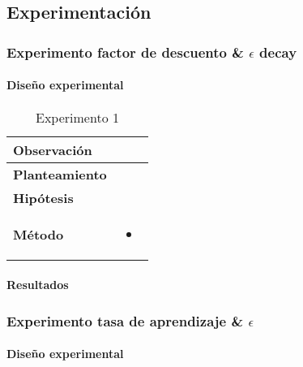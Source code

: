 \subsection{Experimentación}

\subsubsection{Experimento factor de descuento \& \(\epsilon\) decay}

\paragraph{Diseño experimental}

\begin{table}[H]
    \centering
    \begin{tabularx}{\textwidth}{|p{4cm}|X|} %
        \hline %
        \textbf{Observación} &  
        \\ \hline 
        \textbf{Planteamiento} & 
        \\ \hline 
        \textbf{Hipótesis} & 
        \\ \hline 
        \textbf{Método} & 
        \begin{itemize}
            \item 
        \end{itemize}
        \\ \hline
    \end{tabularx}
    \caption{Experimento 1}
    \label{tab:tabla1}
\end{table}

\paragraph{Resultados}

\subsubsection{Experimento tasa de aprendizaje \& \(\epsilon\)}

\paragraph{Diseño experimental}

